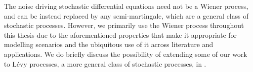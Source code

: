 




The noise driving stochastic differential equations need not be a Wiener process, and can be instead replaced by any semi-martingale, which are a general class of stochastic processes.
However, we primarily use the Wiener process throughout this thesis due to the aforementioned properties that make it appropriate for modelling scenarios and the ubiquitous use of it across literature and applications.
We do briefly discuss the possibility of extending some of our work to L\'evy processes, a  more general class of stochastic processes, in .



